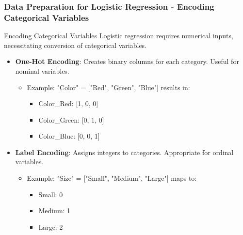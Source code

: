 \documentclass[aspectratio=169]{beamer}
\begin{document}
\begin{frame}[fragile]
  \frametitle{Data Preparation for Logistic Regression - Encoding Categorical Variables}
  \begin{block}{Encoding Categorical Variables}
    Logistic regression requires numerical inputs, necessitating conversion of categorical variables.
  \end{block}
  
  \begin{itemize}
    \item \textbf{One-Hot Encoding}: Creates binary columns for each category. Useful for nominal variables.
      \begin{itemize}
        \item Example: "Color" = ["Red", "Green", "Blue"] results in:
        \begin{itemize}
          \item Color\_Red: [1, 0, 0]
          \item Color\_Green: [0, 1, 0]
          \item Color\_Blue: [0, 0, 1]
        \end{itemize}
      \end{itemize}
    
    \item \textbf{Label Encoding}: Assigns integers to categories. Appropriate for ordinal variables.
      \begin{itemize}
        \item Example: "Size" = ["Small", "Medium", "Large"] maps to:
        \begin{itemize}
          \item Small: 0
          \item Medium: 1
          \item Large: 2
        \end{itemize}
      \end{itemize}
  \end{itemize}
\end{frame}
\end{document}
